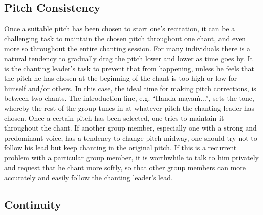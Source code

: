 \subsection*{Pitch Consistency}

  Once a suitable pitch has been chosen to start one's recitation, it can be a challenging task to maintain the chosen pitch throughout one chant, and even more so throughout the entire chanting session. For many individuals there is a natural tendency to gradually drag the pitch lower and lower as time goes by. It is the chanting leader's task to prevent that from happening, unless he feels that the pitch he has chosen at the beginning of the chant is too high or low for himself and/or others. In this case, the ideal time for making pitch corrections, is between two chants. The introduction line, e.g. ``Handa mayaṁ...'', sets the tone, whereby the rest of the group tunes in at whatever pitch the chanting leader has chosen. Once a certain pitch has been selected, one tries to maintain it throughout the chant. If another group member, especially one with a strong and predominant voice, has a tendency to change pitch midway, one should try not to follow his lead but keep chanting in the original pitch. If this is a recurrent problem with a particular group member, it is worthwhile to talk to him privately and request that he chant more softly, so that other group members can more accurately and easily follow the chanting leader's lead.

\subsection*{Continuity}

